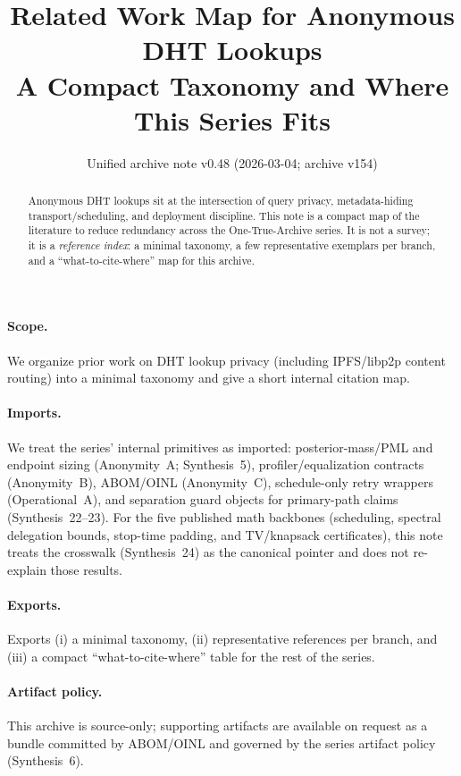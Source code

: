 \documentclass[11pt]{article}
\title{Related Work Map for Anonymous DHT Lookups\\
\large A Compact Taxonomy and Where This Series Fits}
\author{}
\date{Unified archive note v0.48 (2026-03-04; archive v154)}
\begin{document}
\maketitle

\begin{abstract}
Anonymous DHT lookups sit at the intersection of query privacy, metadata-hiding transport/scheduling, and deployment discipline.
This note is a compact map of the literature to reduce redundancy across the One-True-Archive series.
It is not a survey; it is a \emph{reference index}: a minimal taxonomy, a few representative exemplars per branch, and a ``what-to-cite-where'' map for this archive.
\end{abstract}

\paragraph{Scope.}
We organize prior work on DHT lookup privacy (including IPFS/libp2p content routing) into a minimal taxonomy and give a short internal citation map.

\paragraph{Imports.}
We treat the series' internal primitives as imported: posterior-mass/PML and endpoint sizing (Anonymity~A; Synthesis~5), profiler/equalization contracts (Anonymity~B), ABOM/OINL (Anonymity~C), schedule-only retry wrappers (Operational~A), and separation guard objects for primary-path claims (Synthesis~22--23).\cite{series:oddsinflation,series:endpointbridge,series:profiling,series:abomoinl,series:operationalA,series:primarysepmanifest,series:probsep} For the five published math backbones (scheduling, spectral delegation bounds, stop-time padding, and TV/knapsack certificates), this note treats the crosswalk (Synthesis~24) as the canonical pointer and does not re-explain those results.\cite{series:mathcrosswalk}
\paragraph{Exports.}
Exports (i) a minimal taxonomy, (ii) representative references per branch, and (iii) a compact ``what-to-cite-where'' table for the rest of the series.

\paragraph{Artifact policy.}
This archive is source-only; supporting artifacts are available on request as a bundle committed by ABOM/OINL and governed by the series artifact policy (Synthesis~6).\cite{series:artifactpolicy}
\end{document}
